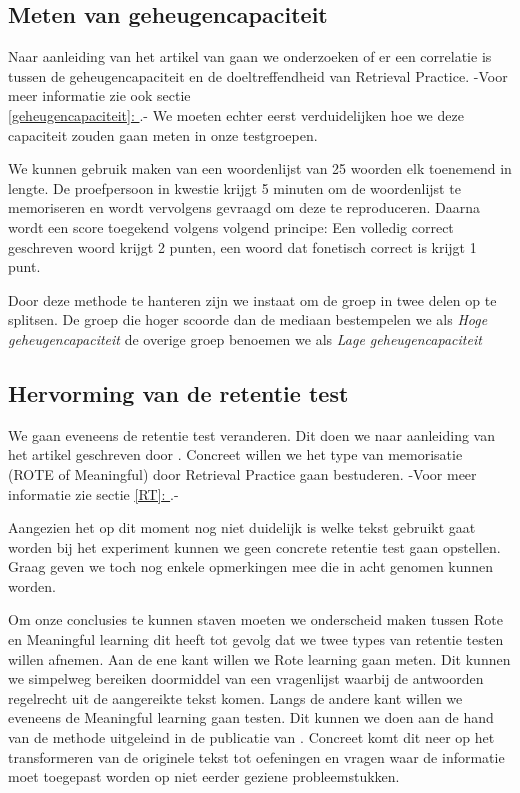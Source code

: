 \documentclass{hogent-article}
\newcommand{\customref}[1]{\underline{\ref{#1}: \nameref{#1}}}
\begin{document}
\subsection{Meten van geheugencapaciteit}
\label{methodology-gc}
Naar aanleiding van het artikel van \textcite{Agarwal_2016} gaan we onderzoeken of er een correlatie is tussen de geheugencapaciteit en de doeltreffendheid van Retrieval Practice. -Voor meer informatie zie ook sectie \\\customref{geheugencapaciteit}.- We moeten echter eerst verduidelijken hoe we deze capaciteit zouden gaan meten in onze testgroepen.\\
\par
\noindent
We kunnen gebruik maken van een woordenlijst van 25 woorden elk toenemend in lengte. De proefpersoon in kwestie krijgt 5 minuten om de woordenlijst te memoriseren en wordt vervolgens gevraagd om deze te reproduceren. Daarna wordt een score toegekend volgens volgend principe: Een volledig correct geschreven woord krijgt 2 punten, een woord dat fonetisch correct is krijgt 1 punt.\\
\par
\noindent
Door deze methode te hanteren zijn we instaat om de groep in twee delen op te splitsen. De groep die hoger scoorde dan de mediaan bestempelen we als \textit{Hoge geheugencapaciteit} de overige groep benoemen we als \textit{Lage geheugencapaciteit}

\subsection{Hervorming van de retentie test}
We gaan eveneens de retentie test veranderen. Dit doen we naar aanleiding van het artikel geschreven door \textcite{van_Gog_2012}. Concreet willen we het type van memorisatie (ROTE of Meaningful) door Retrieval Practice gaan bestuderen. -Voor meer informatie zie sectie \customref{RT}.-\\
\par
\noindent
Aangezien het op dit moment nog niet duidelijk is welke tekst gebruikt gaat worden bij het experiment kunnen we geen concrete retentie test gaan opstellen. Graag geven we toch nog enkele opmerkingen mee die in acht genomen kunnen worden.\\
\par
\noindent
Om onze conclusies te kunnen staven moeten we onderscheid maken tussen Rote en Meaningful learning dit heeft tot gevolg dat we twee types van retentie testen willen afnemen. Aan de ene kant willen we Rote learning gaan meten. Dit kunnen we simpelweg bereiken doormiddel van een vragenlijst waarbij de antwoorden regelrecht uit de aangereikte tekst komen. Langs de andere kant willen we eveneens de Meaningful learning gaan testen. Dit kunnen we doen aan de hand van de methode uitgeleind in de publicatie van \textcite{Mayer_2002}. Concreet komt dit neer op het transformeren van de originele tekst tot oefeningen en vragen waar de informatie moet toegepast worden op niet eerder geziene probleemstukken.
\end{document}
